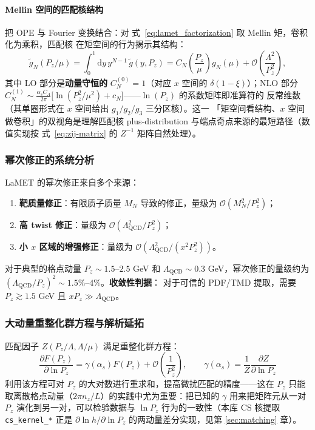 \documentclass[11pt,a4paper]{ctexart}
\newcommand{\order}[1]{\mathcal{O}(#1)}
\newcommand{\code}[1]{\texttt{#1}}
\begin{document}
\paragraph{Mellin 空间的匹配核结构}把 OPE 与 Fourier 变换结合：对
式~\eqref{eq:lamet_factorization} 取 Mellin 矩，卷积化为乘积，匹配核
在矩空间的行为揭示其结构：
\begin{equation}\label{eq:mellin-kernel}
\tilde g_N(P_z/\mu) = \int_0^1\mathrm{d}y\,y^{N-1}\,
\tilde g(y,P_z) = C_N\!\left(\frac{P_z}{\mu}\right) g_N(\mu)
+\order{\frac{\Lambda^2}{P_z^2}},
\end{equation}
其中 LO 部分是\textbf{动量守恒的} $C_N^{(0)}=1$（对应 $x$ 空间的
$\delta(1-\xi)$）；NLO 部分
$C_N^{(1)}\sim\frac{\alpha_sC_A}{2\pi}
\bigl[\ln(P_z^2/\mu^2)+c_N\bigr]$——$\ln(P_z)$ 的系数矩阵即准算符的
反常维数（其单圈形式在 $x$ 空间给出 $g_1/g_2/g_3$ 三分区核）。这一
「矩空间看结构、$x$ 空间做卷积」的双视角是理解匹配核
plus-distribution 与端点奇点来源的最短路径（数值实现按
式~\eqref{eq:zij-matrix} 的 $Z^{-1}$ 矩阵自然处理）。

\subsubsection{幂次修正的系统分析}

LaMET 的幂次修正来自多个来源：
\begin{enumerate}
  \item \textbf{靶质量修正}：有限质子质量 $M_N$ 导致的修正，量级为
  $\order{M_N^2/P_z^2}$；
  \item \textbf{高 twist 修正}：量级为 $\order{\Lambda_{\text{QCD}}^2/P_z^2}$；
  \item \textbf{小 $x$ 区域的增强修正}：量级为
  $\order{\Lambda_{\text{QCD}}^2/(x^2 P_z^2)}$。
\end{enumerate}
对于典型的格点动量 $P_z \sim 1.5\text{--}2.5$ GeV 和
$\Lambda_{\text{QCD}} \sim 0.3$ GeV，幂次修正的量级约为
$(\Lambda_{\text{QCD}}/P_z)^2 \sim 1.5\%\text{--}4\%$。\textbf{收敛性判据}：
对于可信的 PDF/TMD 提取，需要 $P_z \gtrsim 1.5$ GeV 且
$x P_z \gg \Lambda_{\text{QCD}}$。

\subsubsection{大动量重整化群方程与解析延拓}

匹配因子 $Z(P_z/\Lambda, \Lambda/\mu)$ 满足重整化群方程：
\begin{equation}
\frac{\partial F(P_z)}{\partial \ln P_z} = \gamma(\alpha_s) F(P_z)
+ \order{\frac{1}{P_z^{2}}},
\qquad \gamma(\alpha_s) = \frac{1}{Z}\frac{\partial Z}{\partial \ln P_z}
\end{equation}
利用该方程可对 $P_z$ 的大对数进行重求和，提高微扰匹配的精度——这在
$P_z$ 只能取离散格点动量（$2\pi n_z/L$）的实践中尤为重要：把已知的
$\gamma$ 用来把矩阵元从一对 $P_z$ 演化到另一对，可以检验数据与
$\ln P_z$ 行为的一致性（本库 CS 核提取 \code{cs\_kernel\_*} 正是
$\partial\ln h/\partial\ln P_z$ 的两动量差分实现，见第
\ref{sec:matching} 章）。
\end{document}
